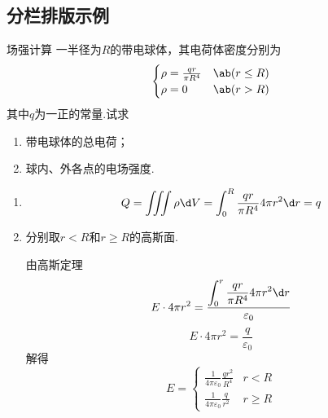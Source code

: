\subsection{分栏排版示例}
{
\begin{multicols}{2}
\begin{exercise}[8]{场强计算}
    一半径为$R$的带电球体，其电荷体密度分别为
    $$
    \begin{cases}
        \rho=\frac{qr}{\pi R^4}&\ab(r\le R)\\
        \rho=0&\ab(r>R)
    \end{cases}
    $$
    其中$q$为一正的常量.试求
    \begin{enumerate}
        \item 带电球体的总电荷；
        \item 球内、外各点的电场强度.
    \end{enumerate}
\end{exercise}
\begin{solution}
    \begin{enumerate}
        \item 
        $$\begin{aligned}
            Q=\iiint{\rho\d V}=\int_0^R{\frac{qr}{\pi R^4}4\pi r^2\d r}=q
        \end{aligned}$$
        \item 分别取$r<R$和$r\ge R$的高斯面.
        
        由高斯定理
        $$E\cdot 4\pi r^2=\frac{\displaystyle\int_0^r{\dfrac{qr}{\pi R^4}4\pi r^2\d r}}{\varepsilon_0}$$
        $$E\cdot 4\pi r^2=\frac{q}{\varepsilon_0}$$
        解得
        $$E=\begin{cases}
            \frac{1}{4\pi\varepsilon_0}\frac{qr^2}{R^4}& r<R\\
            \frac{1}{4\pi\varepsilon_0}\frac{q}{r^2}& r\geq R
        \end{cases}$$
    \end{enumerate}
\end{solution}
\end{multicols}
}